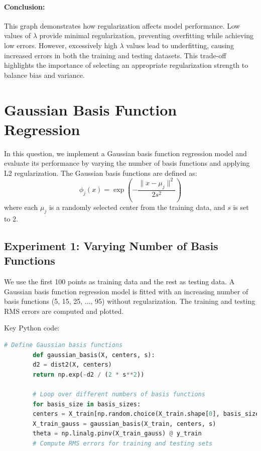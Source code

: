 \documentclass{article}
\begin{document}
	\paragraph{Conclusion:} This graph demonstrates how regularization affects model performance. Low values of $\lambda$ provide minimal regularization, preventing overfitting while achieving low errors. However, excessively high $\lambda$ values lead to underfitting, causing increased errors in both the training and testing datasets. This trade-off highlights the importance of selecting an appropriate regularization strength to balance bias and variance.
	
	
	
	
	\section*{Gaussian Basis Function Regression}
	
	In this question, we implement a Gaussian basis function regression model and evaluate its performance by varying the number of basis functions and applying L2 regularization. The Gaussian basis functions are defined as:
	\[
	\phi_j(x) = \exp\left(-\frac{\| x - \mu_j \|^2}{2s^2}\right)
	\]
	where each \(\mu_j\) is a randomly selected center from the training data, and \(s\) is set to 2.
	
	\subsection*{Experiment 1: Varying Number of Basis Functions}
	We use the first 100 points as training data and the rest as testing data. A Gaussian basis function regression model is fitted with an increasing number of basis functions (5, 15, 25, ..., 95) without regularization. The training and testing RMS errors are computed and plotted.
	
	Key Python code:
	\begin{lstlisting}[language=Python]
		# Define Gaussian basis functions
		def gaussian_basis(X, centers, s):
		d2 = dist2(X, centers)
		return np.exp(-d2 / (2 * s**2))
		
		# Loop over different numbers of basis functions
		for basis_size in basis_sizes:
		centers = X_train[np.random.choice(X_train.shape[0], basis_size)]
		X_train_gauss = gaussian_basis(X_train, centers, s)
		theta = np.linalg.pinv(X_train_gauss) @ y_train
		# Compute RMS errors for training and testing sets
	\end{lstlisting}
	
\end{document}
